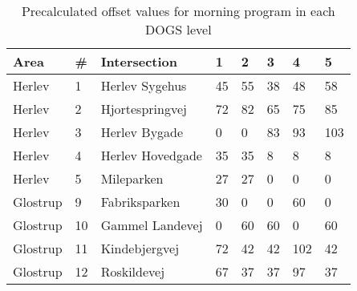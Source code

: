 \begin{table}[ht]
\centering
\begin{tabular}{l|l|l|l|l|l|l|l}
\textbf{Area} & \textbf{\#} & \textbf{Intersection} & \textbf{1} & \textbf{2} & \textbf{3} & \textbf{4} & \textbf{5}\\ \hline
Herlev & 1 & Herlev Sygehus & 45 & 55 & 38 & 48 & 58\\
Herlev & 2 & Hjortespringvej & 72 & 82 & 65 & 75 & 85\\
Herlev & 3 & Herlev Bygade & 0 & 0 & 83 & 93 & 103\\
Herlev & 4 & Herlev Hovedgade & 35 & 35 & 8 & 8 & 8\\
Herlev & 5 & Mileparken & 27 & 27 & 0 & 0 & 0\\ \hline
Glostrup & 9 & Fabriksparken & 30 & 0 & 0 & 60 & 0\\
Glostrup & 10 & Gammel Landevej & 0 & 60 & 60 & 0 & 60\\
Glostrup & 11 & Kindebjergvej & 72 & 42 & 42 & 102 & 42\\
Glostrup & 12 & Roskildevej & 67 & 37 & 37 & 97 & 37\\
\end{tabular}
\caption{Precalculated offset values for morning program in each DOGS level}
\label{tab:offset_values_modified}
\end{table}

\clearpage


